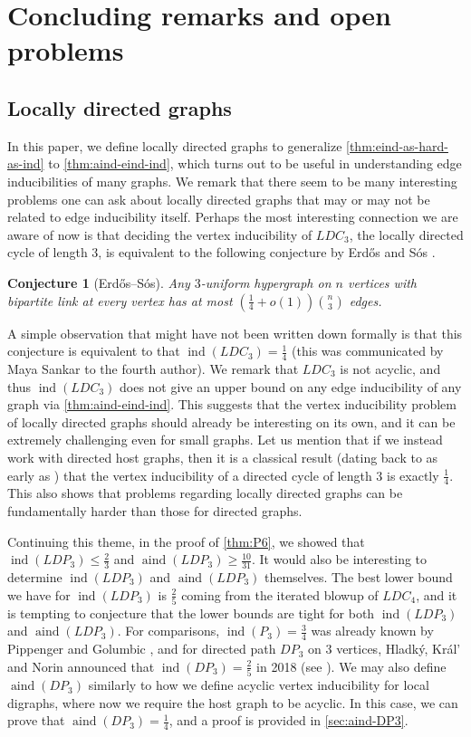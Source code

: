 \documentclass[reqno,11pt]{amsart}
\numberwithin{equation}{section}
\newtheorem{conjecture}[theorem]{Conjecture}
\theoremstyle{definition}
\theoremstyle{remark}
\DeclareMathOperator{\ind}{ind}
\DeclareMathOperator{\aind}{aind}
\begin{document}
\section{Concluding remarks and open problems}\label{sec:conclusion}
\subsection{Locally directed graphs}
In this paper, we define locally directed graphs to generalize \cref{thm:eind-as-hard-as-ind} to \cref{thm:aind-eind-ind}, which turns out to be useful in understanding edge inducibilities of many graphs.
We remark that there seem to be many interesting problems one can ask about locally directed graphs that may or may not be related to edge inducibility itself.
Perhaps the most interesting connection we are aware of now is that deciding the vertex inducibility of $LDC_3$, the locally directed cycle of length $3$, is equivalent to the following conjecture by Erd\H{o}s and S\'os \cite{ErdSos82}.
\begin{conjecture}[Erd\H{o}s--S\'os]\label{conj:ErdosSos}
    Any $3$-uniform hypergraph on $n$ vertices with bipartite link at every vertex has at most $(\frac{1}{4}+o(1))\binom{n}{3}$ edges.
\end{conjecture}

A simple observation that might have not been written down formally is that this conjecture is equivalent to that $\ind(LDC_3)=\frac{1}{4}$ (this was communicated by Maya Sankar to the fourth author).
We remark that $LDC_3$ is not acyclic, and thus $\ind(LDC_3)$ does not give an upper bound on any edge inducibility of any graph via \cref{thm:aind-eind-ind}.
This suggests that the vertex inducibility problem of locally directed graphs should already be interesting on its own, and it can be extremely challenging even for small graphs.
Let us mention that if we instead work with directed host graphs, then it is a classical result (dating back to as early as \cite{KenBab40}) that the vertex inducibility of a directed cycle of length $3$ is exactly $\frac{1}{4}$.
This also shows that problems regarding locally directed graphs can be fundamentally harder than those for directed graphs.

Continuing this theme, in the proof of \cref{thm:P6}, we showed that $\ind(LDP_3)\leq \frac{2}{3}$ and $\aind(LDP_3)\geq \frac{10}{31}$.
It would also be interesting to determine $\ind(LDP_3)$ and $\aind(LDP_3)$ themselves.
The best lower bound we have for $\ind(LDP_3)$ is $\frac{2}{5}$ coming from the iterated blowup of $LDC_4$, and it is tempting to conjecture that the lower bounds are tight for both $\ind(LDP_3)$ and $\aind(LDP_3)$.
For comparisons, $\ind(P_3)=\frac{3}{4}$ was already known by Pippenger and Golumbic \cite{PipGol1975}, and for directed path $DP_3$ on $3$ vertices, Hladk\'y, Kr\'al' and Norin announced that $\ind(DP_3)=\frac{2}{5}$ in 2018 (see \cite{ChoLidPfe20}).
We may also define $\aind(DP_3)$ similarly to how we define acyclic vertex inducibility for local digraphs, where now we require the host graph to be acyclic.
In this case, we can prove that $\aind(DP_3)=\frac{1}{4}$, and a proof is provided in \cref{sec:aind-DP3}.
\end{document}
